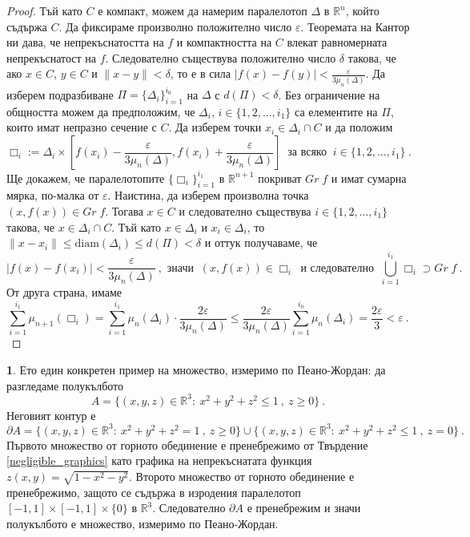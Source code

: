 \documentclass[11pt]{article}
\numberwithin{equation}{section}
\numberwithin{figure}{section}
\numberwithin{table}{section}
\theoremstyle{plain}
\theoremstyle{definition}
\theoremstyle{remark}
\theoremstyle{definition}
\theoremstyle{remark}
\theoremstyle{plain}
\theoremstyle{definition}
\theoremstyle{definition}
\newtheorem{example}[thm]{\protect\examplename}
\theoremstyle{plain}
\theoremstyle{plain}
\theoremstyle{plain}
\theoremstyle{definition}
\theoremstyle{plain}
\providecommand{\examplename}{Пример}
\newcommand*{\R}{\mathbb{R}}
\begin{document}
\begin{proof}
Тъй като $C$ е компакт, можем да намерим паралелотоп $\Delta$ в $\R^n$, който съдържа $C$. Да фиксираме произволно положително число $\varepsilon$. Теоремата на Кантор ни дава, че непрекъснатостта на $f$ и компактността на $C$ влекат равномерната непрекъснатост на $f$. Следователно съществува положително число $\delta$ такова, че ако $x\in C$, $y\in C$ и $\| x-y\| < \delta$, то е в сила $|f(x)-f(y)|<\frac{\varepsilon}{3\mu_n(\Delta)}$. Да изберем подразбиване $\Pi=\{ \Delta_i\}_{i=1}^{i_0}$ на $\Delta$ с $d(\Pi)<\delta$. Без ограничение на общността можем да предположим, че $\Delta_i$, $i\in \{ 1,2,\dots ,i_1\}$ са елементите на $\Pi$, които имат непразно сечение с $C$. Да изберем точки $x_i\in \Delta_i \cap C$ и да положим
$$\Box_i := \Delta_i \times \left[ f(x_i)-\frac{\varepsilon}{3\mu_n(\Delta)}, f(x_i)+\frac{\varepsilon}{3\mu_n(\Delta)}\right] \ \mbox{ за всяко } \ i\in \{ 1,2,\dots ,i_1\} \ .$$
Ще докажем, че паралелотопите $\{ \Box_i\}_{i=1}^{i_1}$ в $\R^{n+1}$ покриват $Gr \; f$ и имат сумарна мярка, по-малка от $\varepsilon$. Наистина, да изберем произволна точка $(x,f(x))\in Gr \; f$. Тогава $x\in C$ и следователно съществува $i\in \{ 1,2,\dots ,i_1\}$ такова, че $x\in \Delta_i \cap C$. Тъй като $x\in \Delta_i$ и $x_i\in \Delta_i$, то $\| x-x_i \| \le \textrm{diam} (\Delta_i)\le d(\Pi)<\delta$ и оттук получаваме, че
$$\left|f(x)-f(x_i)\right|<\frac{\varepsilon}{3\mu_n(\Delta)} \ ,  \mbox{ значи } \ (x,f(x))\in \Box_i \ \mbox{ и следователно } \ \bigcup_{i=1}^{i_1} \Box_i \supset Gr \; f \ .$$
От друга страна, имаме
$$\sum_{i=1}^{i_1} \mu_{n+1}(\Box_i)= \sum_{i=1}^{i_1} \mu_{n}(\Delta_i)\cdot \frac{2\varepsilon}{3\mu_{n}(\Delta)} \le \frac{2\varepsilon}{3\mu_{n}(\Delta)}\sum_{i=1}^{i_0} \mu_{n}(\Delta_i) = \frac{2\varepsilon}{3} < \varepsilon \ .$$
\end{proof}

\begin{example}
Ето един конкретен пример на множество, измеримо по Пеано-Жордан: да разгледаме полукълбото
$$A=\{ (x,y,z)\in \R^3 : \ x^2+y^2+z^2 \le 1 \ , \ z\ge 0\} \ .$$
Неговият контур е
$$\partial A=\{ (x,y,z)\in \R^3 : \ x^2+y^2+z^2 = 1 \ , \ z\ge 0\} \cup \{ (x,y,z)\in \R^3 : \ x^2+y^2+z^2 \le 1 \ , \ z= 0\} \ .$$
Първото множество от горното обединение е пренебрежимо от Твърдение \ref{negligible_graphics} като графика на непрекъснатата функция $z(x,y)=\sqrt{1-x^2-y^2}$. Второто множество от горното обединение е пренебрежимо, защото се съдържа в изродения паралелотоп $[-1,1]\times [-1,1]\times \{ 0\}$ в $\R^3$. Следователно $\partial A$ е пренебрежим и значи полукълбото е множество, измеримо по Пеано-Жордан.
\end{example}
\end{document}
